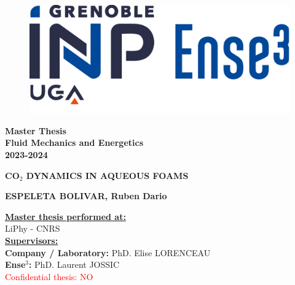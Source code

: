\thispagestyle{empty}
\begin{center}
    	\begin{figure} [t]
    	\centering
		\includegraphics[width=0.5\linewidth]{../fig/GrenobleINP_ense3_logo.png}
	    \end{figure}
    	\vspace{1.5cm}

        \begin{Large}
        
        \textbf{Master Thesis} \\
        \vspace{0.5cm}
        \textbf{Fluid Mechanics and Energetics} \\
        \vspace{0.5cm}
        \textbf{2023-2024}\\
        \end{Large}
        \vspace{1.5cm}
        \begin{large}
        	\textbf{CO$_2$ DYNAMICS IN AQUEOUS FOAMS}\\
        \end{large}
        \vspace{1.5cm}
        \textbf{ESPELETA BOLIVAR, Ruben Dario}\\
        \vspace{3.0cm}
        
\end{center}

\begin{flushleft}
	\textbf{\underline{Master thesis performed at:}}\\
	\vspace{0.5cm}
	LiPhy - CNRS \\
	\vspace{1cm}
	\textbf{\underline{Supervisors:}} \\
	\vspace{0.5cm}
	\textbf{Company / Laboratory:} PhD. Elise LORENCEAU \\
	\textbf{Ense$^3$:} PhD. Laurent JOSSIC \\
	\vspace{3cm}
	\textcolor{red}{Confidential thesis:} \textcolor{red}{NO}
\end{flushleft}


\clearpage
